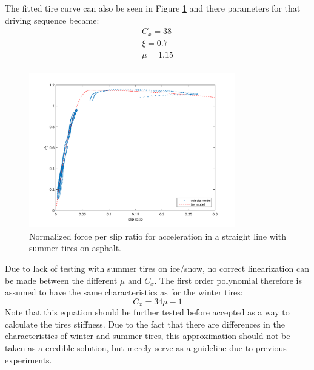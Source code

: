 The fitted tire curve can also be seen in Figure \ref{slip_kraft_lk_sport} and there parameters for that driving sequence became:
\begin{equation}
\label{summer_lk}
\begin{split}
C_{x} = 38 \\
\xi = 0.7 \\
\mu = 1.15 \\
\end{split}
\end{equation}

\begin{figure}[h]
	\centering
	\includegraphics[width=0.8\textwidth]{Pictures/slip_kraft_lk_sport}
	\caption {Normalized force per slip ratio for acceleration in a straight line with summer tires on asphalt.}
	\label{slip_kraft_lk_sport}
\end{figure}

Due to lack of testing with summer tires on ice/snow, no correct linearization can be made between the different $ \mu $ and $ C_{x} $. The first order polynomial therefore is assumed to have the same characteristics as for the winter tires:
\begin{equation}
C_{x} = 34\mu - 1
\end{equation}
Note that this equation should be further tested before accepted as a way to calculate the tires stiffness. Due to the fact that there are differences in the characteristics of winter and summer tires, this approximation should not be taken as a credible solution, but merely serve as a guideline due to previous experiments. 

